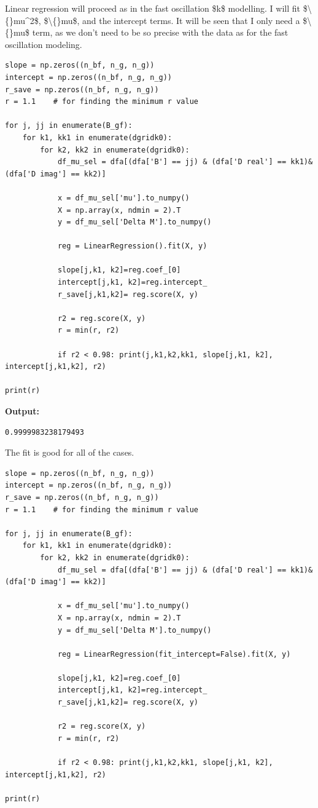 \documentclass{article}
\begin{document}
Linear regression will proceed as in the fast oscillation \$k\$ modelling. I will fit \$\textbackslash\{\}mu\textasciicircum{}2\$, \$\textbackslash\{\}mu\$, and the intercept terms. It will be seen that I only need a \$\textbackslash\{\}mu\$ term, as we don't need to be so precise with the data as for the fast oscillation modeling.

\begin{lstlisting}
slope = np.zeros((n_bf, n_g, n_g))
intercept = np.zeros((n_bf, n_g, n_g))
r_save = np.zeros((n_bf, n_g, n_g))
r = 1.1    # for finding the minimum r value

for j, jj in enumerate(B_gf):
    for k1, kk1 in enumerate(dgridk0):
        for k2, kk2 in enumerate(dgridk0):
            df_mu_sel = dfa[(dfa['B'] == jj) & (dfa['D real'] == kk1)&(dfa['D imag'] == kk2)]

            x = df_mu_sel['mu'].to_numpy()
            X = np.array(x, ndmin = 2).T
            y = df_mu_sel['Delta M'].to_numpy()

            reg = LinearRegression().fit(X, y)

            slope[j,k1, k2]=reg.coef_[0]
            intercept[j,k1, k2]=reg.intercept_
            r_save[j,k1,k2]= reg.score(X, y)

            r2 = reg.score(X, y)
            r = min(r, r2)

            if r2 < 0.98: print(j,k1,k2,kk1, slope[j,k1, k2], intercept[j,k1,k2], r2)

print(r)\end{lstlisting}

\textbf{Output:}\begin{verbatim}
0.9999983238179493

\end{verbatim}

The fit is good for all of the cases.

\begin{lstlisting}
slope = np.zeros((n_bf, n_g, n_g))
intercept = np.zeros((n_bf, n_g, n_g))
r_save = np.zeros((n_bf, n_g, n_g))
r = 1.1    # for finding the minimum r value

for j, jj in enumerate(B_gf):
    for k1, kk1 in enumerate(dgridk0):
        for k2, kk2 in enumerate(dgridk0):
            df_mu_sel = dfa[(dfa['B'] == jj) & (dfa['D real'] == kk1)&(dfa['D imag'] == kk2)]

            x = df_mu_sel['mu'].to_numpy()
            X = np.array(x, ndmin = 2).T
            y = df_mu_sel['Delta M'].to_numpy()

            reg = LinearRegression(fit_intercept=False).fit(X, y)

            slope[j,k1, k2]=reg.coef_[0]
            intercept[j,k1, k2]=reg.intercept_
            r_save[j,k1,k2]= reg.score(X, y)

            r2 = reg.score(X, y)
            r = min(r, r2)

            if r2 < 0.98: print(j,k1,k2,kk1, slope[j,k1, k2], intercept[j,k1,k2], r2)

print(r)\end{lstlisting}
\end{document}
